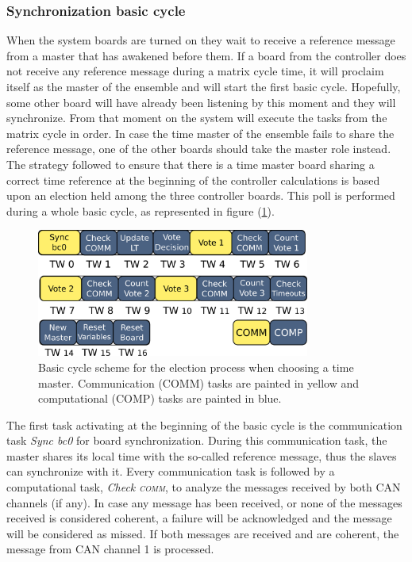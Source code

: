 \documentclass[table,xcdraw]{article}
\begin{document}
\subsubsection{Synchronization basic cycle}\label{sec:method_bc0}
When the system boards are turned on they wait to receive a reference message from a master that has awakened before them. If a board from the controller does not receive any reference message during a matrix cycle time, it will proclaim itself as the master of the ensemble and will start the first basic cycle. Hopefully, some other board will have already been listening by this moment and they will synchronize. From that moment on the system will execute the tasks from the matrix cycle in order. In case the time master of the ensemble fails to share the reference message, one of the other boards should take the master role instead. The strategy followed to ensure that there is a time master board sharing a correct time reference at the beginning of the controller calculations is based upon an election held among the three controller boards. This poll is performed during a whole basic cycle, as represented in figure (\ref{fig:master_election_basic_cycle}).\\

\begin{figure}[h!]
    \centering
    \includegraphics[width=0.8\textwidth]{figures/methodology/basic_cycle_election.png}
    \caption{Basic cycle scheme for the election process when choosing a time master. Communication (COMM) tasks are painted in yellow and computational (COMP) tasks are painted in blue.}
    \label{fig:master_election_basic_cycle}
\end{figure}

The first task activating at the beginning of the basic cycle is the communication task \textit{Sync bc0} for board synchronization. During this communication task, the master shares its local time with the so-called reference message, thus the slaves can synchronize with it.
Every communication task is followed by a computational task, \textit{Check \textsc{comm}}, to analyze the messages received by both CAN channels (if any). In case any message has been received, or none of the messages received is considered coherent, a failure will be acknowledged and the message will be considered as missed. If both messages are received and are coherent, the message from CAN channel 1 is processed.\\
\end{document}
